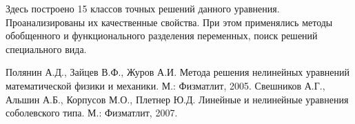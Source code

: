Здесь построено 15 классов точных решений данного уравнения. Проанализированы их качественные свойства. При этом применялись
методы обобщенного и функционального разделения переменных, поиск решений специального вида.


\begin{thebibliography}{99}
Полянин А.Д., Зайцев В.Ф., Журов А.И. Метода решения нелинейных уравнений математической физики и механики. М.: Физматлит, 2005.
Свешников А.Г., Альшин А.Б., Корпусов М.О., Плетнер Ю.Д. Линейные и нелинейные уравнения соболевского типа. М.: Физматлит, 2007.

\end{thebibliography}






%

